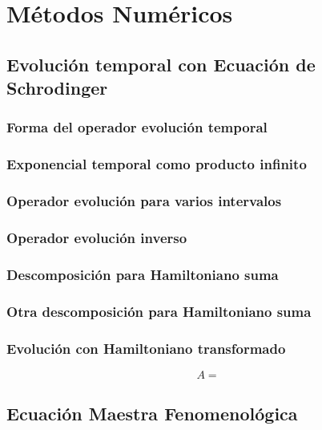 \documentclass{book}
\begin{document}
\chapter{Métodos Numéricos}
\section{{Evolución temporal con Ecuación de Schrodinger}}
\subsection{{Forma del operador evolución temporal}}
\subsection{{Exponencial temporal como producto infinito}}
\subsection{{Operador evolución para varios intervalos}}
\subsection{{Operador evolución inverso}}
\subsection{{Descomposición para Hamiltoniano suma}}
\subsection{{Otra descomposición para Hamiltoniano suma}}
\subsection{{Evolución con Hamiltoniano transformado}}
\begin{equation}\label{eq1}{A=}\end{equation}
\section{{Ecuación Maestra Fenomenológica}}
\end{document}
